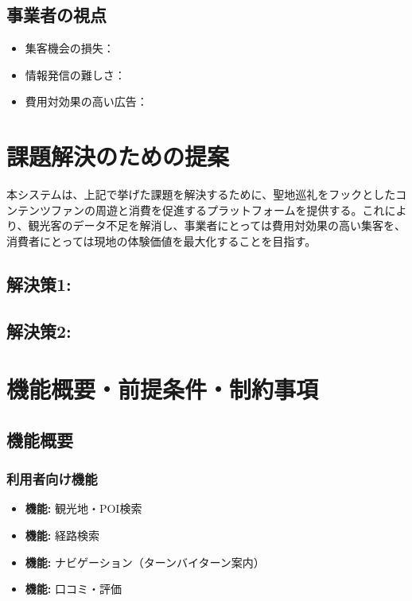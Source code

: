 \documentclass{docs}
\begin{document}
\subsection{事業者の視点}
\begin{itemize}
    \item 集客機会の損失：
    \item 情報発信の難しさ：
    \item 費用対効果の高い広告：
\end{itemize}

\section{課題解決のための提案}

本システムは、上記で挙げた課題を解決するために、聖地巡礼をフックとしたコンテンツファンの周遊と消費を促進するプラットフォームを提供する。これにより、観光客のデータ不足を解消し、事業者にとっては費用対効果の高い集客を、消費者にとっては現地の体験価値を最大化することを目指す。



\subsection{解決策1: }

\subsection{解決策2: }

\section{機能概要・前提条件・制約事項}

\subsection{機能概要}
\subsubsection{利用者向け機能}
\begin{itemize}
    \item \textbf{機能:} 観光地・POI検索
    \item \textbf{機能:} 経路検索
    \item \textbf{機能:} ナビゲーション（ターンバイターン案内）
    \item \textbf{機能:} 口コミ・評価
\end{itemize}
\end{document}
